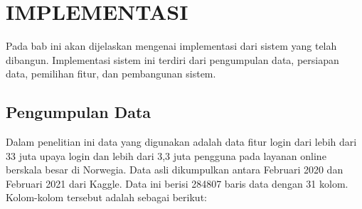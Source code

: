 \chapter{IMPLEMENTASI}
Pada bab ini akan dijelaskan mengenai implementasi dari sistem yang telah dibangun. Implementasi sistem ini terdiri dari pengumpulan data, persiapan data, pemilihan fitur, dan pembangunan sistem.

\section{Pengumpulan Data}
Dalam penelitian ini data yang digunakan adalah data fitur login dari lebih dari 33 juta upaya login dan lebih dari 3,3 juta pengguna pada layanan online berskala besar di Norwegia. Data asli dikumpulkan antara Februari 2020 dan Februari 2021 dari Kaggle. Data ini berisi 284807 baris data dengan 31 kolom. Kolom-kolom tersebut adalah sebagai berikut:

